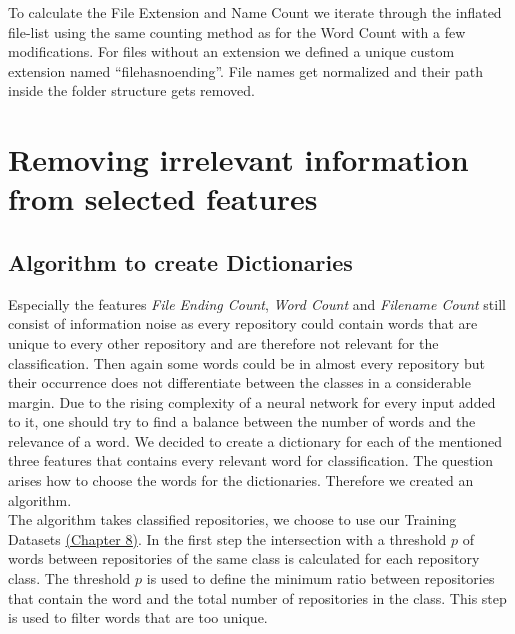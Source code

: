 \documentclass[paper=A4,pagesize=auto,12pt,headinclude=true,footinclude=true,BCOR=0mm,DIV=calc]{scrartcl}
\begin{document}
	To calculate the File Extension and Name Count we iterate through the inflated file-list using the same counting method as for the Word Count with a few modifications. For files without an extension we defined a unique custom extension named “filehasnoending”.
	File names get normalized and their path inside the folder structure gets removed.
	
	
	\section{Removing irrelevant information from selected features}
	\label{sec: dictionary}
	\subsection{Algorithm to create Dictionaries}
	Especially the features \textit{File Ending Count}, \textit{Word Count} and\textit{ Filename Count} still consist of information noise as every repository could contain words that are unique to every other repository and are therefore not relevant for the classification. Then again some words could be in almost every repository but their occurrence does not differentiate between the classes in a considerable margin. Due to the rising complexity of a neural network for every input added to it, one should try to find a balance between the number of words and the relevance of a word. We decided to create a dictionary for each of the mentioned three features that contains every relevant word for classification.
	The question arises how to choose the words for the dictionaries. Therefore we created an algorithm.\\
	
	
	The algorithm takes classified repositories, we choose to use our Training Datasets \hyperref[src:Repositories]{(Chapter 8)}.
	In the first step the intersection with a threshold $p$ of words between repositories of the same class is calculated for each repository class. The threshold $p$ is used to define the minimum ratio between repositories that contain the word and the total number of repositories in the class. 
	This step is used to filter words that are too unique.
	
\end{document}
